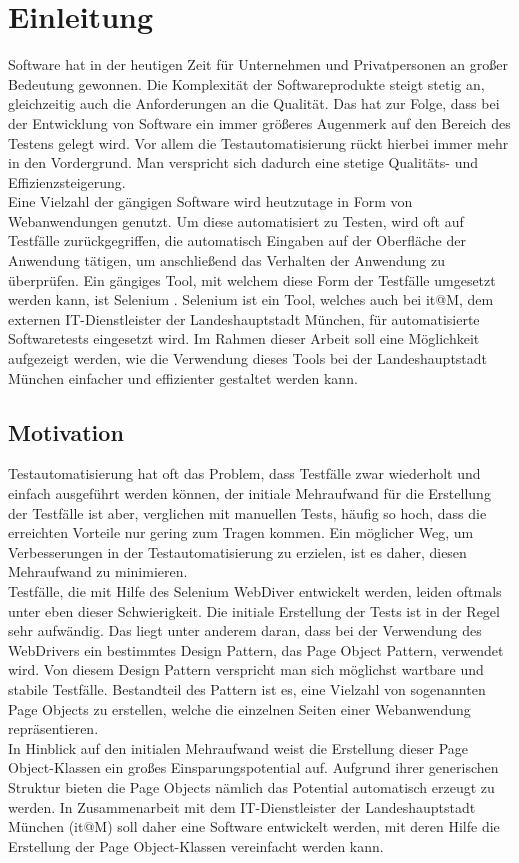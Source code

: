 \chapter{Einleitung}
\label{sec:einleitung}
Software hat in der heutigen Zeit für Unternehmen und Privatpersonen an großer Bedeutung gewonnen.
Die Komplexität der Softwareprodukte steigt stetig an, gleichzeitig auch die Anforderungen an die Qualität.
Das hat zur Folge, dass bei der Entwicklung von Software ein immer größeres Augenmerk auf den Bereich des Testens gelegt wird.
Vor allem die Testautomatisierung rückt hierbei immer mehr in den Vordergrund.
Man verspricht sich dadurch eine stetige Qualitäts- und Effizienzsteigerung.\\
Eine Vielzahl der gängigen Software wird heutzutage in Form von Webanwendungen genutzt.
Um diese automatisiert zu Testen, wird oft auf Testfälle zurückgegriffen, die automatisch Eingaben auf der Oberfläche der Anwendung tätigen, um anschließend das Verhalten der Anwendung zu überprüfen.
Ein gängiges Tool, mit welchem diese Form der Testfälle umgesetzt werden kann, ist Selenium \cite{selenium_selenium_2015}. Selenium ist ein Tool, welches auch bei it@M, dem externen IT-Dienstleister der Landeshauptstadt München, für automatisierte Softwaretests eingesetzt wird. Im Rahmen dieser Arbeit soll eine Möglichkeit aufgezeigt werden, wie die Verwendung dieses Tools bei der Landeshauptstadt München einfacher und effizienter gestaltet werden kann.
\\

\section{Motivation}
\label{sec:motivation}
Testautomatisierung hat oft das Problem, dass Testfälle zwar wiederholt und einfach ausgeführt werden können, der initiale Mehraufwand für die Erstellung der Testfälle ist aber, verglichen mit manuellen Tests, häufig so hoch, dass die erreichten Vorteile nur gering zum Tragen kommen. Ein möglicher Weg, um Verbesserungen in der Testautomatisierung zu erzielen, ist es daher, diesen Mehraufwand zu minimieren.\\
Testfälle, die mit Hilfe des Selenium WebDiver entwickelt werden, leiden oftmals unter eben dieser Schwierigkeit. Die initiale Erstellung der Tests ist in der Regel sehr aufwändig.
Das liegt unter anderem daran, dass bei der Verwendung des WebDrivers ein bestimmtes Design Pattern, das Page Object Pattern, verwendet wird. Von diesem Design Pattern verspricht man sich möglichst wartbare und stabile Testfälle.
Bestandteil des Pattern ist es, eine Vielzahl von sogenannten Page Objects zu erstellen, welche die einzelnen Seiten einer Webanwendung repräsentieren.\\
In Hinblick auf den initialen Mehraufwand weist die Erstellung dieser Page Object-Klassen ein großes Einsparungspotential auf. Aufgrund ihrer generischen Struktur bieten die Page Objects nämlich das Potential automatisch erzeugt zu werden.
In Zusammenarbeit mit dem IT-Dienstleister der Landeshauptstadt München (it@M) soll daher eine Software entwickelt werden, mit deren Hilfe die Erstellung der Page Object-Klassen vereinfacht werden kann.

